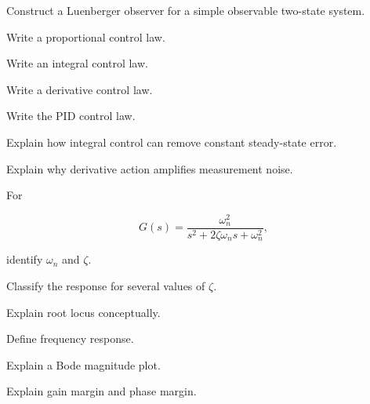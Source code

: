 \begin{exercise}[3]
Construct a Luenberger observer for a simple observable two-state system.
\end{exercise}

\begin{exercise}[2]
Write a proportional control law.
\end{exercise}

\begin{exercise}[2]
Write an integral control law.
\end{exercise}

\begin{exercise}[2]
Write a derivative control law.
\end{exercise}

\begin{exercise}[2]
Write the PID control law.
\end{exercise}

\begin{exercise}[3]
Explain how integral control can remove constant steady-state error.
\end{exercise}

\begin{exercise}[3]
Explain why derivative action amplifies measurement noise.
\end{exercise}

\begin{exercise}[2]
For

\[
G(s)
=
\frac{\omega_n^2}
{s^2+2\zeta\omega_ns+\omega_n^2},
\]

identify \(\omega_n\) and \(\zeta\).
\end{exercise}

\begin{exercise}[3]
Classify the response for several values of \(\zeta\).
\end{exercise}

\begin{exercise}[2]
Explain root locus conceptually.
\end{exercise}

\begin{exercise}[2]
Define frequency response.
\end{exercise}

\begin{exercise}[2]
Explain a Bode magnitude plot.
\end{exercise}

\begin{exercise}[3]
Explain gain margin and phase margin.
\end{exercise}

